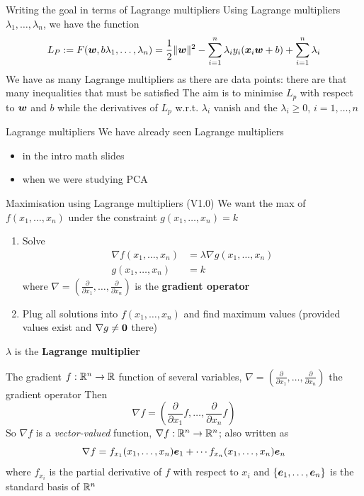 \documentclass[aspectratio=169]{beamer}\usepackage[]{graphicx}\usepackage[]{xcolor}
\begin{document}
\begin{frame}{Writing the goal in terms of Lagrange multipliers}
    Using Lagrange multipliers $\lambda_1,\ldots,\lambda_n$, we have the function
    \[
        L_P:=F(\bm{w},b\lambda_1,\ldots,\lambda_n) =
        \frac 12\|\bm{w}\|^2 -\sum_{i=1}^n \lambda_iy_i(\bm{x}_i\bm{w}+b)
        +\sum_{i=1}^n\lambda_i
    \]
    \vfill
    We have as many Lagrange multipliers as there are data points: there are that many inequalities that must be satisfied
    \vfill 
    The aim is to minimise $L_p$ with respect to $\bm{w}$ and $b$ while the derivatives of $L_p$ w.r.t. $\lambda_i$ vanish and the $\lambda_i\geq 0$, $i=1,\ldots,n$
\end{frame}

\begin{frame}{Lagrange multipliers}
    We have already seen Lagrange multipliers
    \vfill
    \begin{itemize}
    \item in the intro math slides
    \vfill
    \item when we were studying PCA
    \end{itemize}
\end{frame}

\begin{frame}{Maximisation using Lagrange multipliers (V1.0)}
    We want the max of $f(x_1,\ldots,x_n)$ under the constraint $g(x_1,\ldots,x_n)=k$
    \begin{enumerate}
    \item Solve
    \begin{align*}
    \nabla f(x_1,\ldots,x_n) &= \lambda\nabla g(x_1,\ldots,x_n) \\
    g(x_1,\ldots,x_n) &= k
    \end{align*}
    where $\nabla=(\frac{\partial}{\partial x_1},\ldots,\frac{\partial}{\partial x_n})$ is the \textbf{gradient operator}
    \item Plug all solutions into $f(x_1,\ldots,x_n)$ and find maximum values (provided values exist and $\nabla g\neq \b0$ there)
    \end{enumerate}
    \vfill
    $\lambda$ is the \textbf{Lagrange multiplier}
\end{frame}
    
    
\begin{frame}{The gradient}
    $f:\mathbb{R}^n\to\mathbb{R}$ function of several variables, $\nabla=\left(\frac{\partial}{\partial x_1},\ldots,\frac{\partial}{\partial x_n}\right)$ the gradient operator
    \vfill
    Then
    \[
    \nabla f = \left(
    \frac{\partial}{\partial x_1}f,\ldots,
    \frac{\partial}{\partial x_n}f
    \right)
    \]
    \vfill
    So $\nabla f$ is a \emph{vector-valued} function, $\nabla f:\mathbb{R}^n\to\mathbb{R}^n$; also written as
    \[
    \nabla f = f_{x_1}(x_1,\ldots,x_n)\bm{e}_1+\cdots f_{x_n}(x_1,\ldots,x_n)\bm{e}_n
    \]
    where $f_{x_i}$ is the partial derivative of $f$ with respect to $x_i$ and $\{\bm{e}_1,\ldots,\bm{e}_n\}$ is the standard basis of $\mathbb{R}^n$
\end{frame}
\end{document}
